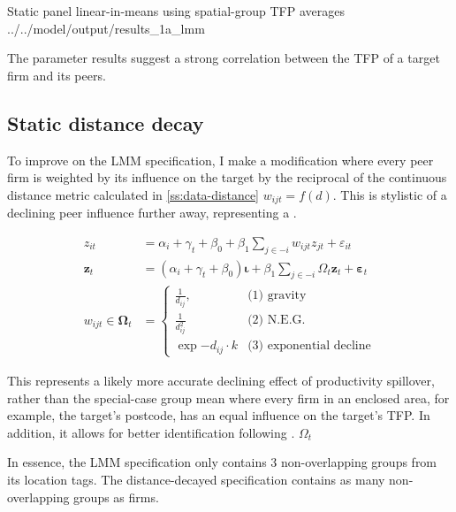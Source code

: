 \wraptable
    {Static panel linear-in-means using spatial-group TFP averages}
    {../../model/output/results_1a_lmm}
    {}

The parameter results suggest a strong correlation between the TFP of a target firm and its peers.

\newpage
\subsection{Static distance decay}
\label{ss:model-dd}

To improve on the LMM specification, I make a modification where
every peer firm is weighted by its influence on the target by the reciprocal of the 
continuous distance metric calculated in \ref{ss:data-distance}
$w_{ijt}=f(d)$. This is stylistic of a declining peer influence further away,
representing a .

\begin{align}
    \label{eq:dd-structural1}
    z_{it} &= \alpha_i + \gamma_t + \beta_0
            + \beta_1 \sum_{j\in-i} w_{ijt}z_{jt} + \varepsilon_{it}
    \\
    \mathbf z_{t} &= (\alpha_i + \gamma_t + \beta_0)\mathbf\iota
            + \beta_1 \sum_{j\in-i} \Omega_t \mathbf z_{t} + \mathbf \varepsilon_{t}
    \\
    w_{ijt}\in \mathbf \Omega_t &=
        \begin{cases}
            \frac1{d_{ij}},         &\text{(1) gravity}                                      \\
            \frac1{d_{ij}^2}        &\text{(2) N.E.G.} \\
            \exp{-d_{ij}\cdot k}    &\text{(3) exponential decline}
        \end{cases}
\end{align}

This represents a likely more accurate declining effect of productivity spillover,
rather than the special-case group mean where every firm in an enclosed area,
for example, the target's postcode, has an equal influence on the target's TFP.
In addition, it allows for better identification following \cite{Bramoulle2009}.
$\Omega_t$
\par \noindent
In essence, the LMM specification only contains 3 non-overlapping groups
from its location tags. The distance-decayed specification
contains as many non-overlapping groups as firms.

